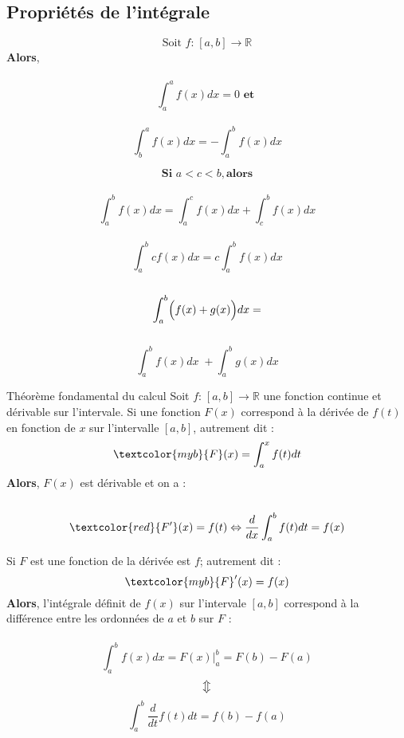 \documentclass{report}
\begin{document}
\begin{multicols*}{3}
\section{Propriétés de l'intégrale}

\begin{Concept}{}{}

$$\text{Soit } f\text{:} \; [a,b] \rightarrow \mathbb{R}$$ \textbf{Alors}, \\\\
$$\int_{a}^{a}f(x)dx = 0 \textbf{ et }$$
\\
$$\int_{b}^{a}f(x)dx = - \int_{a}^{b}f(x)dx$$


\vspace{2em}
$$\textbf{Si } a < c < b,  \textbf{alors}$$ 
\\ 
$$\int_{a}^{b}f(x)dx = \int_{a}^{c}f(x)dx + \int_{c}^{b}f(x)dx $$ 
\\
$$\int_{a}^{b}cf(x)dx = c\int_{a}^{b}f(x)dx$$ 
\\

$$ \int_{a}^{b}\Bigl(f(x) + g(x)\Bigr)dx =$$ \\ 
$$\int_{a}^{b}f(x)dx \; +  \int_{a}^{b}g(x)dx$$
\end{Concept}

\begin{Definitionx*}{Théorème fondamental du calcul}{}
    Soit $f\text{:} \; [a,b] \rightarrow \mathbb{R}$ une fonction continue
    et dérivable sur l'intervale. 
    Si une fonction  $F(x)$ correspond à la dérivée de  $f(t)$ en fonction de $x$ 
    sur l'intervalle  $[a, b]$, autrement dit : 
    $$\textcolor{myb}{F}(x) = \int_{a}^{x}f(t)dt$$ 
    \textbf{Alors}, $F(x)$ est dérivable et on a :\\\\ 
    $$\textcolor{red}{F^{\prime}}(x) = f(t) \Leftrightarrow \dfrac{d}{dx}\int_{a}^{b}f(t)dt = f(x)$$

  \vspace{2em}
  Si $F$ est une fonction de la dérivée est $f$; autrement dit : 
  $$\textcolor{myb}{F}^{\prime}(x) = f(x)$$            
  \textbf{Alors}, l'intégrale définit de $f(x)$ sur l'intervale $[a, b]$ correspond à
  la différence entre les ordonnées de $a$ et $b$ sur $F$ :
  \\\\
  
  $$\int_{a}^{b}f(x)dx = F(x)  \bigg|_{a}^{b} = F(b) - F(a) $$
  $$\big\Updownarrow$$
  $$\int_{a}^{b}\dfrac{d}{dt}f(t)dt =  f(b) - f(a)$$ 
\end{Definitionx*}



\end{multicols*}
\end{document}
